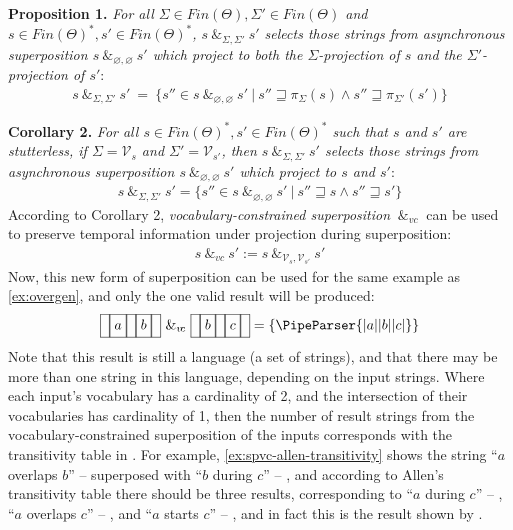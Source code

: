 \documentclass[a4paper,12pt,leqno]{article}
\newcommand{\vph}[1]{\vphantom{#1}}
\newcommand{\ebox}[1]{\fbox{$\vph{'(),}#1$}}
\newcommand{\nbBefore}[2]{\ebox{#1}\ebox{}\ebox{#2}}
\newcommand{\nbOverlaps}[2]{\ebox{#1}\ebox{#1,#2}\ebox{#2}}
\newcommand{\nbDuring}[2]{\ebox{#2}\ebox{#1,#2}\ebox{#2}}
\newcommand{\nbStarts}[2]{\ebox{#1,#2}\ebox{#2}}
\newcommand{\Before}[2]{\ebox{}\nbBefore{#1}{#2}\ebox{}}
\newcommand{\Overlaps}[2]{\ebox{}\nbOverlaps{#1}{#2}\ebox{}}
\newcommand{\During}[2]{\ebox{}\nbDuring{#1}{#2}\ebox{}}
\newcommand{\Starts}[2]{\ebox{}\nbStarts{#1}{#2}\ebox{}}
\newcommand{\cOverlaps}[2]{``$#1$ overlaps $#2$'' -- \Overlaps{#1}{#2}}
\newcommand{\cDuring}[2]{``$#1$ during $#2$'' -- \During{#1}{#2}}
\newcommand{\cStarts}[2]{``$#1$ starts $#2$'' -- \Starts{#1}{#2}}
\newcommand{\spsigma}[1][\Sigma, \Sigma']{~\&_{#1}~}
\newcommand{\spvc}{~\&_{v\!c}~}
\renewcommand{\emptyset}{\varnothing}
\newcommand{\EventString}[1]{%
	\renewcommand*{\do}[1]{\ebox{##1}}%
	\PipeParser{#1}%
}
\begin{document}
\noindent
\textbf{Proposition 1.} {\sl For all $\Sigma \in Fin(\Theta), \Sigma' \in Fin(\Theta)$ and $s \in Fin(\Theta)^*, s' \in Fin(\Theta)^*$, $s \spsigma s'$ selects those strings from asynchronous superposition $s \spsigma[\emptyset, \emptyset] s'$ which project to both the $\Sigma$-projection of $s$ and the $\Sigma'$-projection of $s'$}:
\begin{align}
s \spsigma s' ~=~ \{s'' \in s \spsigma[\emptyset, \emptyset] s' ~|~
s'' \sqsupseteq \pi_{\Sigma}(s) \wedge s'' \sqsupseteq \pi_{\Sigma'}(s')\}
\end{align}

\noindent
\textbf{Corollary 2.} {\sl For all $s \in Fin(\Theta)^*, s' \in Fin(\Theta)^*$ such that $s$ and $s'$ are stutterless, if $\Sigma = \mathcal{V}_s$ and $\Sigma' =\mathcal{V}_{s'}$, then $s \spsigma s'$ selects those strings from asynchronous superposition $s \spsigma[\emptyset, \emptyset] s'$ which project to $s$ and $s'$}:
\begin{align}
s \spsigma s' = \{s''\in s \spsigma[\emptyset, \emptyset] s' ~|~ s'' \sqsupseteq s \wedge s'' \sqsupseteq s'\}
\end{align}
\doublespacing
According to Corollary 2, \textit{vocabulary-constrained superposition} $\spvc$ can be used to preserve temporal information under projection during superposition:
\begin{align}\label{def:vc-superposition}
s \spvc s' :=  s \spsigma[\mathcal{V}_s, \mathcal{V}_{s'}] s'
\end{align}
Now, this new form of superposition can be used for the same example as \cref{ex:overgen}, and only the one valid result will be produced:
\begin{align}
	\Before{a}{b} \spvc \Before{b}{c} = \{\EventString{{}|a|{}|b|{}|c|{}}\}
\end{align}
Note that this result is still a language (a set of strings), and that there may be more than one string in this language, depending on the input strings. Where each input's vocabulary has a cardinality of 2, and the intersection of their vocabularies has cardinality of 1, then the number of result strings from the vocabulary-constrained superposition of the inputs corresponds with the transitivity table in \citet[Fig. 4]{allen1983maintaining}. For example, \cref{ex:spvc-allen-transitivity} shows the string \cOverlaps{a}{b} superposed with \cDuring{b}{c}, and according to Allen's transitivity table there should be three results, corresponding to \cDuring{a}{c}, \cOverlaps{a}{c}, and \cStarts{a}{c}, and in fact this is the result shown by .
\end{document}
